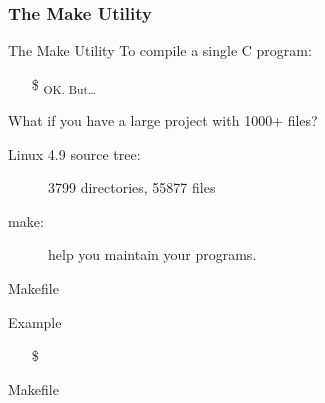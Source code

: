 \subsubsection{The Make Utility}

\begin{frame}{The Make Utility}
  To compile a single C program:
  \begin{itemize}
  \item[\$] \quad{\Huge \correct}\textsubscript{{\tiny OK. But\ldots}}
  \end{itemize}
  \begin{block}{What if you have a large project with 1000+ files?}
    \begin{center}
    \end{center}
    \begin{description}
    \item[Linux 4.9 source tree:] 3799 directories, 55877 files
    \end{description}
  \end{block}
  \begin{description}
  \item[make:] help you maintain your programs.
  \end{description}
\end{frame}

\begin{frame}{Makefile}
  \begin{block}{}
  \end{block}
  \begin{block}{Example}
  \end{block}
  \begin{itemize}
  \item[\$] 
  \end{itemize}
\end{frame}

\begin{frame}{Makefile}
  \begin{minipage}{.75\linewidth}
  \end{minipage}
  \begin{minipage}{.2\linewidth}
    \begin{center}
    \end{center}
  \end{minipage}
\end{frame}

